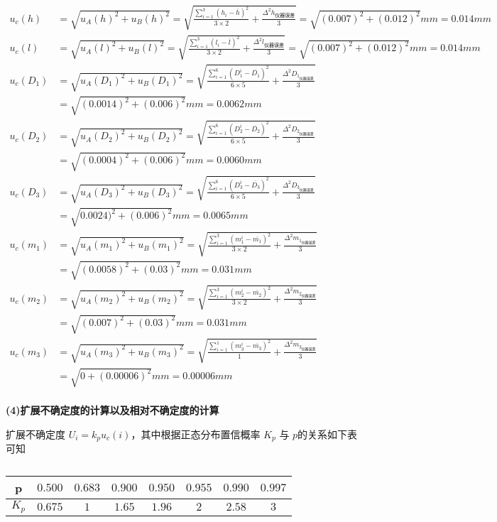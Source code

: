 \documentclass[UTF8]{ctexart}
\begin{document}
\begin{align*}
    u_c(h) &= \sqrt{u_A(h)^2+u_B(h)^2}  = \sqrt{\frac{\sum_{i=1}^{3}(h_i-\overline{h})^2}{3\times 2}+\frac{\Delta^2h_{\text{仪器误差}}}{3}} = \sqrt{(0.007)^2+(0.012)^2}mm =0.014 mm\\
    u_c(l) &= \sqrt{u_A(l)^2+u_B(l)^2}  = \sqrt{\frac{\sum_{i=1}^{3}(l_i-\overline{l})^2}{3\times 2}+\frac{\Delta^2l_{\text{仪器误差}}}{3}} = \sqrt{(0.007)^2+(0.012)^2}mm =0.014 mm\\
    u_c(D_1) &= \sqrt{u_A(D_1)^2+u_B(D_1)^2}  = \sqrt{\frac{\sum_{i=1}^{6}(D_1^i-\overline{D_1})^2}{6\times 5}+\frac{\Delta^2D_{1_{{\text{仪器误差}}}}}{3}} \\&= \sqrt{(0.0014)^2+(0.006)^2}mm = 0.0062 mm\\
    u_c(D_2) &= \sqrt{u_A(D_2)^2+u_B(D_2)^2}  = \sqrt{\frac{\sum_{i=1}^{6}(D_2^i-\overline{D_2})^2}{6\times 5}+\frac{\Delta^2D_{2_{{\text{仪器误差}}}}}{3}} \\&= \sqrt{(0.0004)^2+(0.006)^2}mm = 0.0060  mm \\
    u_c(D_3) &= \sqrt{u_A(D_3)^2+u_B(D_3)^2}  = \sqrt{\frac{\sum_{i=1}^{6}(D_3^i-\overline{D_3})^2}{6\times 5}+\frac{\Delta^2D_{3_{{\text{仪器误差}}}}}{3}} \\&= \sqrt{0.0024)^2+(0.006)^2}mm = 0.0065mm\\
    u_c(m_1) &= \sqrt{u_A(m_1)^2+u_B(m_1)^2}  = \sqrt{\frac{\sum_{i=1}^{3}(m_1^i-\overline{m_1})^2}{3\times 2}+\frac{\Delta^2 m_{1_{{\text{仪器误差}}}}}{3}} \\&= \sqrt{(0.0058)^2+(0.03)^2}mm = 0.031mm \\
    u_c(m_2) &= \sqrt{u_A(m_2)^2+u_B(m_2)^2}  = \sqrt{\frac{\sum_{i=1}^{3}(m_2^i-\overline{m_2})^2}{3\times 2}+\frac{\Delta^2 m_{2_{{\text{仪器误差}}}}}{3}} \\&= \sqrt{(0.007)^2+(0.03)^2}mm = 0.031mm \\
    u_c(m_3) &= \sqrt{u_A(m_3)^2+u_B(m_3)^2}  = \sqrt{\frac{\sum_{i=1}^{1}(m_3^i-\overline{m_3})^2}{1}+\frac{\Delta^2 m_{3_{{\text{仪器误差}}}}}{3}}  \\&= \sqrt{0+(0.00006)^2}mm = 0.00006mm\\
\end{align*}

\begin{spacing}{1.2}
\textbf{(4)扩展不确定度的计算以及相对不确定度的计算}

扩展不确定度 $U_{i} = k_p u_{c}(i)$，其中根据正态分布置信概率 $K_p$ 与 $p$的关系如下表可知
\end{spacing}
\begin{table}[H]
\centering
\begin{tabular}{|c|c|c|c|c|c|c|c|}
\hline
     p & $0.500$ & $0.683$ & $0.900$ & $0.950$ & $0.955$ & $0.990$ & $0.997$  \\
\hline
      $K_p$ & $0.675$ & $1$ & $1.65$ & $1.96$ & $2$ & $2.58$ & $3$ \\
\hline
\end{tabular}
\caption*{}
\end{table}
\end{document}
